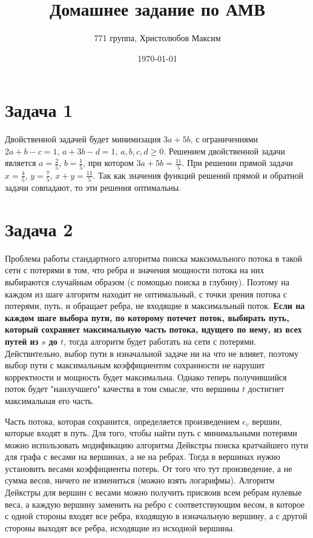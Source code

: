 \documentclass[a4paper,12pt]{article} %
\author{771 группа, Христолюбов Максим}
\title{Домашнее задание по АМВ}
\date{\today}
\begin{document}
	
	\maketitle
	
\section{Задача 1}
\hspace{5mm}
Двойственной задачей будет минимизация $3a+5b$, с ограничениями $2a+b-c=1$, $a+3b-d=1$, $a,b,c,d\geq 0$. Решением двойственной задачи является $a=\frac{2}{5}$, $b=\frac{1}{5}$, при котором $3a+5b=\frac{11}{5}$. При решении прямой задачи $x=\frac{4}{5}$, $y=\frac{7}{5}$, $x+y=\frac{11}{5}$. Так как значения функций решений прямой и обратной задачи совпадают, то эти решения оптимальны.

\section{Задача 2}
\hspace{5mm}
Проблема работы стандартного алгоритма поиска максимального потока в такой сети с потерями в том, что ребра и значения мощности потока на них выбираются случайным образом (с помощью поиска в глубину). Поэтому на каждом из шаге алгоритм находит не оптимальный, с точки зрения потока с потерями, путь, и обращает ребра, не входящие в максимальный поток. \textbf{Если на каждом шаге выбора пути, по которому потечет поток, выбирать путь, который сохраняет максимальную часть потока, идущего по нему, из всех путей из $s$ до $t$}, тогда алгоритм будет работать на сети с потерями. Действительно, выбор пути в изначальной задаче ни на что не влияет, поэтому выбор пути с максимальным коэффициентом сохранности не нарушит корректности и мощность будет максимальна. Однако теперь получившийся поток будет "наилучшего" качества в том смысле, что вершины $t$ достигнет максимальная его часть. 

Часть потока, которая сохранится, определяется произведением $\epsilon_v$ вершин, которые входят в путь. Для того, чтобы найти путь с минимальными потерями можно использовать модификацию алгоритма Дейкстры поиска кратчайшего пути для графа с весами на вершинах, а не на ребрах. Тогда в вершинах нужно установить весами коэффициенты потерь. От того что тут произведение, а не сумма весов, ничего не измениться (можно взять логарифмы). Алгоритм Дейкстры для вершин с весами можно получить присвоив всем ребрам нулевые веса, а каждую вершину заменить на ребро с соответствующим весом, в которое с одной стороны входят все ребра, входящую в изначальную вершину, а с другой стороны выходят все ребра, исходящие из исходной вершины. 
\end{document}
